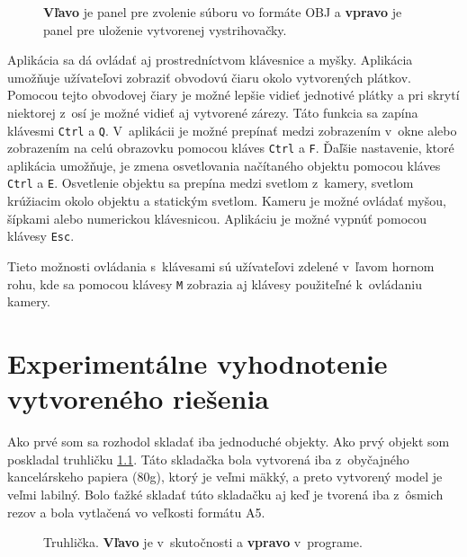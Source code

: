 \begin{figure}[!h]
\centering
{}\quad
{}
\caption{\textbf{Vľavo} je panel pre zvolenie súboru vo formáte OBJ a \textbf{vpravo} je panel pre uloženie vytvorenej vystrihovačky.}
\label{FileExplorer}
\end{figure}


Aplikácia sa dá ovládať aj prostredníctvom klávesnice a myšky. Aplikácia umožňuje užívateľovi zobraziť obvodovú čiaru okolo vytvorených plátkov. Pomocou tejto obvodovej čiary je možné lepšie vidieť jednotivé plátky a pri skrytí niektorej z~osí je možné vidieť aj vytvorené zárezy. Táto funkcia sa zapína klávesmi \texttt{Ctrl} a \texttt{Q}. V~aplikácii je možné prepínať medzi zobrazením v~okne alebo zobrazením na celú obrazovku pomocou kláves \texttt{Ctrl} a \texttt{F}. Ďaľšie nastavenie, ktoré aplikácia umožňuje, je zmena osvetlovania načítaného objektu pomocou kláves \texttt{Ctrl} a \texttt{E}. Osvetlenie objektu sa prepína medzi svetlom z~kamery, svetlom krúžiacim okolo objektu a statickým svetlom. Kameru je možné ovládať myšou, šípkami alebo numerickou klávesnicou.
Aplikáciu je možné vypnúť pomocou klávesy \texttt{Esc}.

Tieto možnosti ovládania s~klávesami sú užívateľovi zdelené v~ľavom hornom rohu, kde sa pomocou klávesy \texttt{M} zobrazia aj klávesy použiteľné k~ovládaniu kamery.

\chapter{Experimentálne vyhodnotenie vytvoreného riešenia}

Ako prvé som sa rozhodol skladať iba jednoduché objekty. Ako prvý objekt som poskladal truhličku \ref{Truhlicka}. Táto skladačka bola vytvorená iba z~obyčajného kancelárskeho papiera (80g), ktorý je veľmi mäkký, a preto vytvorený model je veľmi labilný. Bolo ťažké skladať túto skladačku aj keď je tvorená iba z~ôsmich rezov a bola vytlačená vo veľkosti formátu A5.

\begin{figure}[!h]
\centering
{}\quad
{}
\caption{Truhlička. \textbf{Vľavo} je v~skutočnosti a \textbf{vpravo} v~programe.}
\label{Truhlicka}
\end{figure}

